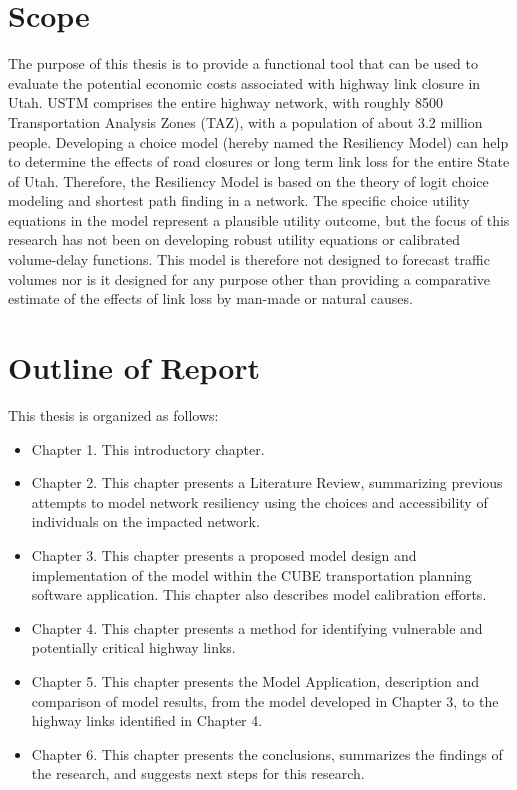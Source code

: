 \section{Scope}
The purpose of this thesis is to provide a functional tool that can be used to evaluate
the potential economic costs associated with highway link closure in Utah. USTM comprises
the entire highway network, with roughly 8500 Transportation Analysis Zones (TAZ),
with a population of about 3.2 million people.
Developing a choice model (hereby named the Resiliency Model) can help to determine
the effects of road closures or long term link loss for the entire State of Utah.
Therefore, the Resiliency Model is based on the theory of logit choice modeling and
shortest path finding in a network. The specific choice utility equations in the model represent
a plausible utility outcome, but the focus of this research has not been on developing robust
utility equations or calibrated volume-delay functions. This model is therefore not designed to
forecast traffic volumes nor is it designed for any purpose other than providing a comparative estimate
of the effects of link loss by man-made or natural causes.

\section{Outline of Report}

\noindent This thesis is organized as follows:

\begin{itemize}
	\item Chapter 1.	This introductory chapter.
	\item Chapter 2.	This chapter presents a Literature Review, summarizing previous attempts to model network resiliency using the choices and accessibility of individuals on the impacted network.
	\item Chapter 3.	This chapter presents a proposed model design and implementation of the model within the CUBE transportation planning software application. This chapter also describes model calibration efforts.
	\item Chapter 4.	This chapter presents a method for identifying vulnerable and potentially critical highway links.
  \item Chapter 5.	This chapter presents the Model Application, description and comparison of model results, from the model developed in Chapter 3, to the highway links identified in Chapter 4.
	\item Chapter 6.	This chapter presents the conclusions, summarizes the findings of the research, and suggests next steps for this research.
\end{itemize}
